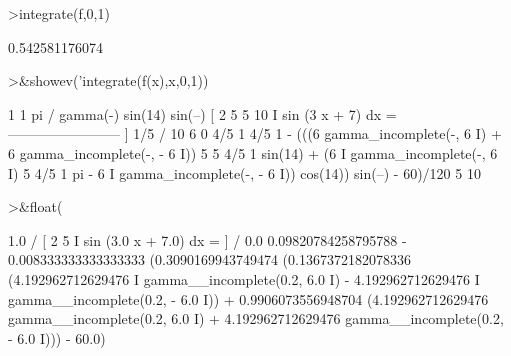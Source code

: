 \documentclass[a4paper,10pt]{article}
\begin{document}
\begin{eulernotebook}
\begin{euleroutput}
\end{euleroutput}
\begin{eulerprompt}
>integrate(f,0,1)
\end{eulerprompt}
\begin{euleroutput}
  0.542581176074
\end{euleroutput}
\begin{eulerprompt}
>&showev('integrate(f(x),x,0,1))
\end{eulerprompt}
\begin{euleroutput}
  
           1                           1              pi
          /                      gamma(-) sin(14) sin(--)
          [     2    5                 5              10
          I  sin (3 x  + 7) dx = ------------------------
          ]                                  1/5
          /                              10 6
           0
         4/5                  1          4/5                  1
   - (((6    gamma_incomplete(-, 6 I) + 6    gamma_incomplete(-, - 6 I))
                              5                               5
               4/5                    1
   sin(14) + (6    I gamma_incomplete(-, 6 I)
                                      5
      4/5                    1                       pi
   - 6    I gamma_incomplete(-, - 6 I)) cos(14)) sin(--) - 60)/120
                             5                       10
  
\end{euleroutput}
\begin{eulerprompt}
>&float(%
\end{eulerprompt}
\begin{euleroutput}
  
           1.0
          /
          [       2      5
          I    sin (3.0 x  + 7.0) dx = 
          ]
          /
           0.0
  0.09820784258795788 - 0.008333333333333333
   (0.3090169943749474 (0.1367372182078336
   (4.192962712629476 I gamma__incomplete(0.2, 6.0 I)
   - 4.192962712629476 I gamma__incomplete(0.2, - 6.0 I))
   + 0.9906073556948704 (4.192962712629476 gamma__incomplete(0.2, 6.0 I)
   + 4.192962712629476 gamma__incomplete(0.2, - 6.0 I))) - 60.0)
  

\end{euleroutput}
\end{eulernotebook}
\end{document}
